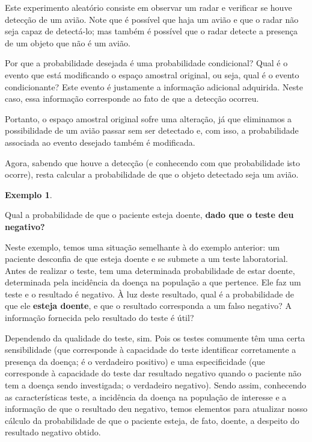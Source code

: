 \documentclass[
]{book}
\theoremstyle{definition}
\theoremstyle{definition}
\newtheorem{example}{Exemplo}[chapter]
\theoremstyle{definition}
\theoremstyle{remark}
\begin{document}
Este experimento aleatório consiste em observar um radar e verificar se houve detecção de um avião. Note que é possível que haja um avião e que o radar não seja capaz de detectá-lo; mas também é possível que o radar detecte a presença de um objeto que não é um avião.

Por que a probabilidade desejada é uma probabilidade condicional? Qual é o evento que está modificando o espaço amostral original, ou seja, qual é o evento condicionante? Este evento é justamente a informação adicional adquirida. Neste caso, essa informação corresponde ao fato de que a detecção ocorreu.

Portanto, o espaço amostral original sofre uma alteração, já que eliminamos a possibilidade de um avião passar sem ser detectado e, com isso, a probabilidade associada ao evento desejado também é modificada.

Agora, sabendo que houve a detecção (e conhecendo com que probabilidade isto ocorre), resta calcular a probabilidade de que o objeto detectado seja um avião.

\begin{example}
\protect\hypertarget{exm:unnamed-chunk-3}{}{\label{exm:unnamed-chunk-3} }
\end{example}

Qual a probabilidade de que o paciente esteja doente, \textbf{dado que o teste deu negativo?}

Neste exemplo, temos uma situação semelhante à do exemplo anterior: um paciente desconfia de que esteja doente e se submete a um teste laboratorial. Antes de realizar o teste, tem uma determinada probabilidade de estar doente, determinada pela incidência da doença na população a que pertence. Ele faz um teste e o resultado é negativo. À luz deste resultado, qual é a probabilidade de que ele \textbf{esteja doente}, e que o resultado corresponda a um falso negativo? A informação fornecida pelo resultado do teste é útil?

Dependendo da qualidade do teste, sim. Pois os testes comumente têm uma certa sensibilidade (que corresponde à capacidade do teste identificar corretamente a presença da doença; é o verdadeiro positivo) e uma especificidade (que corresponde à capacidade do teste dar resultado negativo quando o paciente não tem a doença sendo investigada; o verdadeiro negativo). Sendo assim, conhecendo as características teste, a incidência da doença na população de interesse e a informação de que o resultado deu negativo, temos elementos para atualizar nosso cálculo da probabilidade de que o paciente esteja, de fato, doente, a despeito do resultado negativo obtido.
\end{document}
